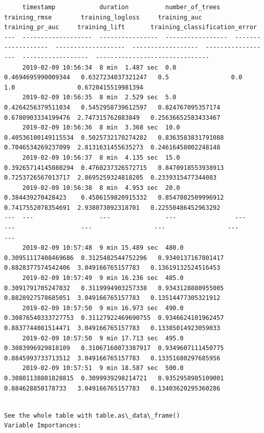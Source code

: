\documentclass[11pt]{article}
\begin{document}
    
    \begin{verbatim}
     timestamp            duration          number_of_trees    training_rmse        training_logloss     training_auc        training_pr_auc     training_lift       training_classification_error
---  -------------------  ----------------  -----------------  -------------------  -------------------  ------------------  ------------------  ------------------  -------------------------------
     2019-02-09 10:56:34  8 min  1.487 sec  0.0                0.4694695990009344   0.6327234037321247   0.5                 0.0                 1.0                 0.6720415519981394
     2019-02-09 10:56:35  8 min  2.529 sec  5.0                0.4264256379511034   0.5452958739612597   0.824767095357174   0.6780903334199476  2.747315762883849   0.25636652583433467
     2019-02-09 10:56:36  8 min  3.368 sec  10.0               0.40536100149115534  0.5025732170274282   0.8363583831791088  0.7046534269237099  2.8131631455635273  0.24616458002248148
     2019-02-09 10:56:37  8 min  4.135 sec  15.0               0.39265714145080294  0.4760237326572715   0.8470918553938913  0.7253726567013717  2.8695259324818205  0.2339315477344083
     2019-02-09 10:56:38  8 min  4.953 sec  20.0               0.384439270428423    0.4586159820915332   0.8547082509996912  0.7417552078354691  2.938073092318701   0.22550486452963292
---  ---                  ---               ---                ---                  ---                  ---                 ---                 ---                 ---
     2019-02-09 10:57:48  9 min 15.489 sec  480.0              0.30951117408469686  0.3125482544752296   0.9340137167801417  0.8828377574542406  3.049166765157783   0.13619132524516453
     2019-02-09 10:57:49  9 min 16.236 sec  485.0              0.3091791705247032   0.3119994903257338   0.9343128880955005  0.8828927578685051  3.049166765157783   0.13514477305321912
     2019-02-09 10:57:50  9 min 16.973 sec  490.0              0.30876540333727753  0.31127922469690755  0.9346624101962457  0.8837744081514471  3.049166765157783   0.13385014923059033
     2019-02-09 10:57:50  9 min 17.713 sec  495.0              0.3083996929818109   0.31067160073387917  0.9349607111450775  0.8845993733713512  3.049166765157783   0.13351680297685956
     2019-02-09 10:57:51  9 min 18.587 sec  500.0              0.30801138801828815  0.3099939298214721   0.9352958985109001  0.884628850178733   3.049166765157783   0.13403620295360286
    \end{verbatim}

    
    \begin{Verbatim}[commandchars=\\\{\}]

See the whole table with table.as\_data\_frame()
Variable Importances: 

    \end{Verbatim}
\end{document}
